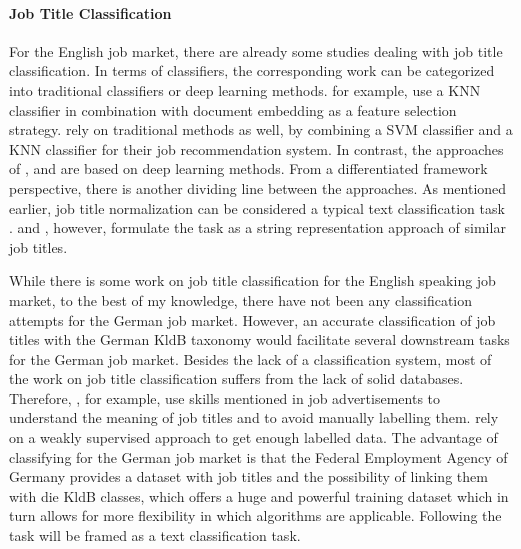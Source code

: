 \documentclass[12pt, a4paper, titlepage]{article}
\begin{document}
\paragraph{Job Title Classification}
For the English job market, there are already some studies dealing with job title classification. In terms of classifiers, the corresponding work can be categorized into traditional classifiers or deep learning methods. \cite{zhu2017} for example, use a \ac{KNN} classifier in combination with document embedding as a feature selection strategy. \cite{javed2015} rely on traditional methods as well, by combining a \ac{SVM} classifier and a \ac{KNN} classifier for their job recommendation system. In contrast, the approaches of \cite{decorte2021}, \cite{wang2019} and \cite{neculoiu2016} are based on deep learning methods. From a differentiated framework perspective, there is another dividing line between the approaches. As mentioned earlier, job title normalization can be considered a typical text classification task \citep{wang2019, javed2015, zhu2017}. \cite{decorte2021} and \cite{neculoiu2016}, however, formulate the task as a string representation approach of similar job titles. 

While there is some work on job title classification for the English speaking job market, to the best of my knowledge, there have not been any classification attempts for the German job market. However, an accurate classification of job titles with the German \ac{KldB} taxonomy would facilitate several downstream tasks for the German job market. Besides the lack of a classification system, most of the work on job title classification suffers from the lack of solid databases. Therefore, \cite{decorte2021}, for example, use skills mentioned in job advertisements to understand the meaning of job titles and to avoid manually labelling them. \cite{javed2015} rely on a weakly supervised approach to get enough labelled data. The advantage of classifying for the German job market is that the Federal Employment Agency of Germany provides a dataset with job titles and the possibility of linking them with die \ac{KldB} classes, which offers a huge and powerful training dataset which in turn allows for more flexibility in which algorithms are applicable. Following \citet{wang2019, javed2015, zhu2017} the task will be framed as a text classification task. 
\end{document}
